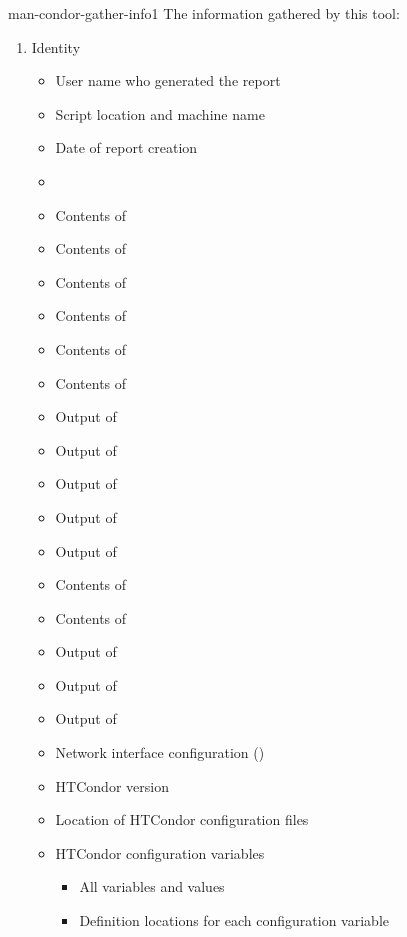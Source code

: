 \begin{ManPage}{}{man-condor-gather-info}{1}
The information gathered by this tool:
\begin{enumerate}
	\item Identity
	\begin{itemize}
          \item User name who generated the report
          \item Script location and machine name
          \item Date of report creation
          \item {}
          \item Contents of 
          \item Contents of 
          \item Contents of 
          \item Contents of 
          \item Contents of 
          \item Contents of 
          \item Output of 
          \item Output of 
          \item Output of 
          \item Output of 
          \item Output of 
          \item Contents of 
          \item Contents of 
          \item Output of 
          \item Output of 
          \item Output of 
          \item Network interface configuration ()
          \item HTCondor version
          \item Location of HTCondor configuration files
          \item HTCondor configuration variables
		  \begin{itemize}
                \item All variables and values
                \item Definition locations for each configuration variable 

\end{itemize}
\end{itemize}
\end{enumerate}
\end{ManPage}
